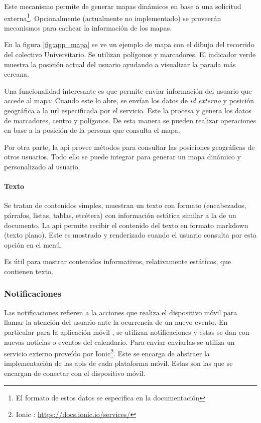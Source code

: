 Este mecanismo permite de generar mapas dinámicos en base a una solicitud externa\footnote{El formato de estos datos se especifica en la documentación}. Opcionalmente (actualmente no implementado) se proveerán mecanismos para cachear la información de los mapas.

En la figura \ref{fig:app_mapa} se ve un ejemplo de mapa con el dibujo del recorrido del colectivo Universitario. Se utilizan polígonos y marcadores. El indicador verde muestra la posición actual del usuario ayudando a visualizar la parada más cercana.


Una funcionalidad interesante es que permite enviar información del usuario que accede al mapa: Cuando este lo abre, se envían los datos de \textit{id externo} y posición geográfica a la \gls{url} especificada por el servicio. Este la procesa y genera los datos de marcadores, centro y polígonos. De esta manera se pueden realizar operaciones en base a la posición de la persona que consulta el mapa.

Por otra parte, la \gls{api} provee métodos para consultar las posiciones geográficas de otros usuarios. Todo ello se puede integrar para generar un mapa dinámico y personalizado al usuario.

\paragraph{Texto}
\label{funcionalidad_contenidos_texto} 

Se tratan de contenidos simples, muestran un texto con formato (encabezados, párrafos, listas, tablas, etcétera) con información estática similar a la de un documento. 
La \gls{api} permite recibir el contenido del texto en formato \gls{markdown} (texto plano). Este es mostrado y renderizado cuando el usuario consulta por esta opción en el menú.

Es útil para mostrar contenidos informativos, relativamente estáticos, que contienen texto.

\subsubsection{Notificaciones}
\label{funcionalidad_notificaciones}

Las notificaciones refieren a la acciones que realiza el dispositivo móvil para llamar la atención del usuario ante la ocurrencia de un nuevo evento. En particular para la aplicación móvil \nombreApp{}, se utilizan notificaciones  y estas se dan con nuevas noticias o eventos del calendario. Para enviar enviarlas se utiliza un servicio externo proveído por Ionic\footnote{Ionic : \url{https://docs.ionic.io/services/}}. Este se encarga de abstraer la implementación de las \glspl{api} de cada plataforma móvil. Estas son las que se encargan de conectar con el dispositivo móvil.

